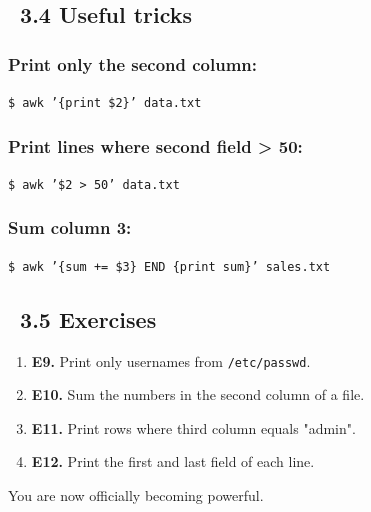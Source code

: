 \documentclass[12pt]{article}
\newcommand{\fireicon}{\faFire}
\newcommand{\exerciseicon}{\faTasks}
\begin{document}
\subsection*{\fireicon\ 3.4 Useful tricks}

\subsubsection*{Print only the second column:}

\begin{highlightbox}
\texttt{\$ awk '\{print \$2\}' data.txt}
\end{highlightbox}

\subsubsection*{Print lines where second field > 50:}

\begin{highlightbox}
\texttt{\$ awk '\$2 > 50' data.txt}
\end{highlightbox}

\subsubsection*{Sum column 3:}

\begin{highlightbox}
\texttt{\$ awk '\{sum += \$3\} END \{print sum\}' sales.txt}
\end{highlightbox}

\subsection*{\exerciseicon\ 3.5 Exercises}

\begin{enumerate}
    \item \textbf{E9.} Print only usernames from \texttt{/etc/passwd}.
    
    \item \textbf{E10.} Sum the numbers in the second column of a file.
    
    \item \textbf{E11.} Print rows where third column equals "admin".
    
    \item \textbf{E12.} Print the first and last field of each line.
\end{enumerate}

\begin{infobox}
You are now officially becoming powerful.
\end{infobox}
\end{document}
